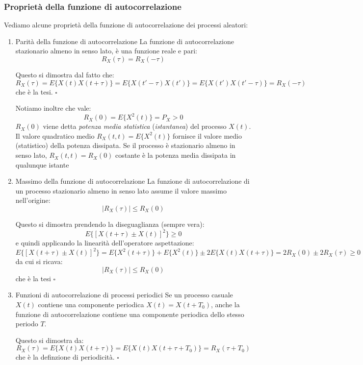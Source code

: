 \documentclass[a4paper,11pt]{article}
\begin{document}
\subsubsection{Proprietà della funzione di autocorrelazione}
Vediamo alcune proprietà della funzione di autocorrelazione dei processi aleatori:
\begin{enumerate}
\item \begin{theorem}{Parità della funzione di autocorrelazione}
La funzione di autocorrelazione stazionario almeno in senso lato, è una funzione reale e pari:
$$
R_X(\tau) = R_X(-\tau)
$$
\end{theorem}
Questo si dimostra dal fatto che:
$$
R_X(\tau) = E\{X(t) X(t + \tau)\} = E\{X(t' - \tau)X(t')\} = E\{X(t')X(t' - \tau)\} = R_X(-\tau)
$$
che è la tesi. \hfill $\square$

Notiamo inoltre che vale:
$$
R_X(0) = E\{X^2(t)\} = P_X > 0
$$
$R_X(0)$ viene detta \textit{potenza media statistica} (\textit{istantanea}) del processo $X(t)$. Il valore quadratico medio $R_X(t, t) = E\{X^2(t)\}$ fornisce il valore medio (statistico) della potenza dissipata. Se il processo è stazionario almeno in senso lato, $R_X(t, t) = R_X(0)$ costante è la potenza media dissipata in qualunque istante

\item \begin{theorem}{Massimo della funzione di autocorrelazione}
La funzione di autocorrelazione di un processo stazionario almeno in senso lato assume il valore massimo nell’origine:
$$
|R_X(\tau)| \leq R_X(0)
$$
\end{theorem}
Questo si dimostra prendendo la diseguaglianza (sempre vera):
$$
E\{ \left[ X(t + \tau) \pm X(t) \right]^2 \} \geq 0
$$
e quindi applicando la linearità dell'operatore aspettazione:
$$
E\{ \left[ X(t + \tau) \pm X(t) \right]^2 \} = E\{X^2(t + \tau)\} + E\{X^2(t)\} \pm 2 E \{X(t)X(t + \tau)\} = 2 R_X(0) \pm 2 R_X(\tau) \geq 0 
$$
da cui si ricava:
$$
|R_X(\tau)| \leq R_X(0)
$$
che è la tesi \hfill $\square$

\item \begin{theorem}{Funzioni di autocorrelazione di processi periodici}
Se un processo casuale $X(t)$ contiene una componente periodica $X(t) = X(t + T_0)$, anche la funzione di autocorrelazione contiene una componente periodica dello stesso periodo $T$.
\end{theorem}
Questo si dimostra da:
$$
R_X(\tau) = E\{X(t)X(t + \tau)\} = E\{X(t)X(t + \tau + T_0)\} = R_X(\tau + T_0)
$$
che è la definzione di periodicità. \hfill $\square$


\end{enumerate}
\end{document}
